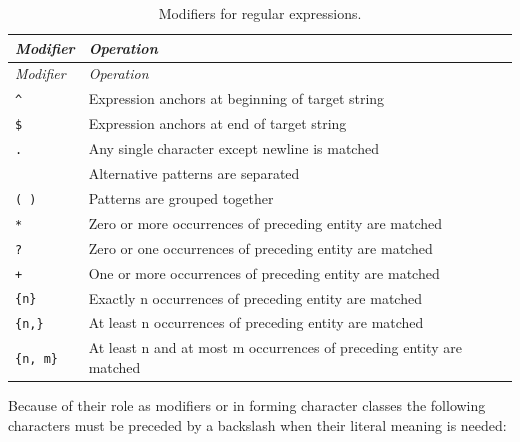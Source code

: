 \documentclass[
]{book}
\begin{document}
\begin{longtable}[]{@{}
  >{\raggedright\arraybackslash}p{}
  >{\raggedright\arraybackslash}p{}@{}}
\caption{\label{tab:RegExprMod} Modifiers for regular expressions.}\tabularnewline
\toprule\noalign{}
\begin{minipage}[b]{\linewidth}\raggedright
\emph{{Modifier}}
\end{minipage} & \begin{minipage}[b]{\linewidth}\raggedright
\emph{{Operation}}
\end{minipage} \\
\midrule\noalign{}
\endfirsthead
\toprule\noalign{}
\begin{minipage}[b]{\linewidth}\raggedright
\emph{{Modifier}}
\end{minipage} & \begin{minipage}[b]{\linewidth}\raggedright
\emph{{Operation}}
\end{minipage} \\
\midrule\noalign{}
\endhead
\bottomrule\noalign{}
\endlastfoot
\texttt{\^{}} & Expression anchors at beginning of target string \\
\texttt{\$} & Expression anchors at end of target string \\
\texttt{.} & Any single character except newline is matched \\
\texttt{\textbar{}} & Alternative patterns are separated \\
\texttt{(\ )} & Patterns are grouped together \\
\texttt{*} & Zero or more occurrences of preceding entity are matched \\
\texttt{?} & Zero or one occurrences of preceding entity are matched \\
\texttt{+} & One or more occurrences of preceding entity are matched \\
\texttt{\{n\}} & Exactly n occurrences of preceding entity are matched \\
\texttt{\{n,\}} & At least n occurrences of preceding entity are matched \\
\texttt{\{n,\ m\}} & At least n and at most m occurrences of preceding entity are matched \\
\end{longtable}

Because of their role as modifiers or in forming character classes the following characters must be preceded by a backslash when their literal meaning is needed:
\end{document}
